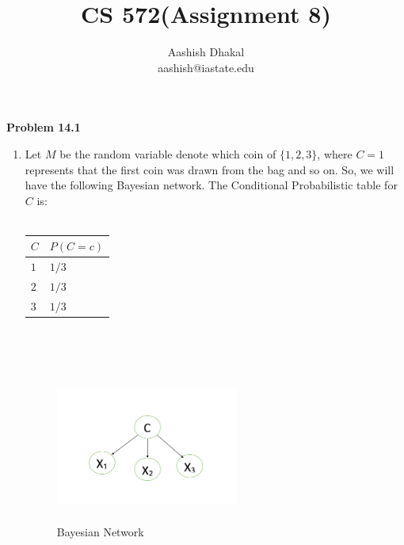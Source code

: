 \documentclass[11pt]{article}
\begin{document}
\title{CS 572(Assignment 8)} %
\author{Aashish Dhakal\\ %
aashish@iastate.edu\\%
 }      %
\date{}


\maketitle
\section*{}

\textbf{Problem 14.1}
\begin{enumerate}[label=(\alph*)]
  \item Let $M$ be the random variable denote which coin of $\{ 1, 2, 3 \}$, where $C=1$ represents that the first coin was drawn from the bag
  and so on. So, we will have the following Bayesian network.
        The Conditional Probabilistic table for $C$ is:\\ \\
        \begin{tabular}{ | m{0.5cm}| m{1.8cm} | }
          \hline
            $C$ &  $P(C=c)$ \\
            \hline
            $1$ & $1/3$ \\
            \hline
            $2$ & $1/3$ \\
            \hline
            $3$ & $1/3$ \\
            \hline
       \end{tabular}\\ \\

    \begin{figure}
        \center
        \includegraphics[width=6cm, height=5cm]{bay.png}
          \caption{Bayesian Network}
  \end{figure}


\end{enumerate}
\end{document}
